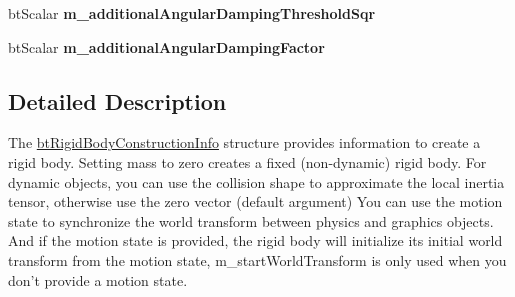 \begin{DoxyCompactItemize}
\item 
\hypertarget{structbt_rigid_body_1_1bt_rigid_body_construction_info_af9ce4aa036c0610ff1acb9e30df35c85}{bt\+Scalar {\bfseries m\+\_\+additional\+Angular\+Damping\+Threshold\+Sqr}}\label{structbt_rigid_body_1_1bt_rigid_body_construction_info_af9ce4aa036c0610ff1acb9e30df35c85}

\item 
\hypertarget{structbt_rigid_body_1_1bt_rigid_body_construction_info_a79629c6fa7631eeb72f25d10b4e17513}{bt\+Scalar {\bfseries m\+\_\+additional\+Angular\+Damping\+Factor}}\label{structbt_rigid_body_1_1bt_rigid_body_construction_info_a79629c6fa7631eeb72f25d10b4e17513}

\end{DoxyCompactItemize}


\subsection{Detailed Description}
The \hyperlink{structbt_rigid_body_1_1bt_rigid_body_construction_info}{bt\+Rigid\+Body\+Construction\+Info} structure provides information to create a rigid body. Setting mass to zero creates a fixed (non-\/dynamic) rigid body. For dynamic objects, you can use the collision shape to approximate the local inertia tensor, otherwise use the zero vector (default argument) You can use the motion state to synchronize the world transform between physics and graphics objects. And if the motion state is provided, the rigid body will initialize its initial world transform from the motion state, m\+\_\+start\+World\+Transform is only used when you don't provide a motion state. 


